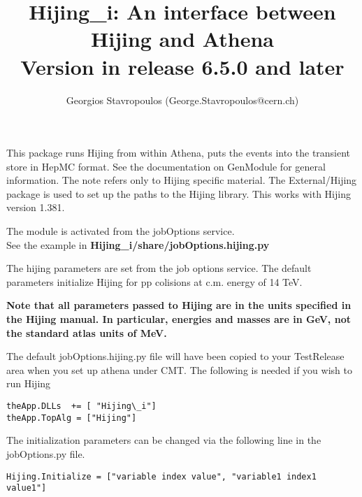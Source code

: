 \documentclass[11pt]{article}
\begin{document}
\title{Hijing\_i: An interface between Hijing and Athena\\
Version in release 6.5.0 and later}
\author{ Georgios Stavropoulos (George.Stavropoulos@cern.ch)}

\maketitle           

This package runs Hijing from within Athena, puts the events into the
transient store in HepMC format. See the documentation on GenModule  for
general information. The note refers only to Hijing specific
material. The External/Hijing package is used to set up the paths to
the Hijing library. This works with Hijing version 1.381.

The module is activated from the jobOptions service. \\See the example
in {\bf Hijing\_i/share/jobOptions.hijing.py }

The hijing parameters are set from the job options service. The
default parameters initialize Hijing for pp colisions at c.m. energy of 14 TeV.

{ \bf Note that all parameters passed to Hijing are in the units specified
in the Hijing manual. In particular, energies and masses are in GeV,
not the standard atlas units of MeV. }

The default jobOptions.hijing.py file will have been copied to your TestRelease
area when you set up athena under CMT.
The following is needed if you wish to run Hijing
\begin{verbatim}
theApp.DLLs  += [ "Hijing\_i"]
theApp.TopAlg = ["Hijing"]
\end{verbatim}
The initialization parameters can be changed via the following line in the jobOptions.py
file.

\begin{verbatim}Hijing.Initialize = ["variable index value", "variable1 index1 value1"]
\end{verbatim} 
\end{document}
